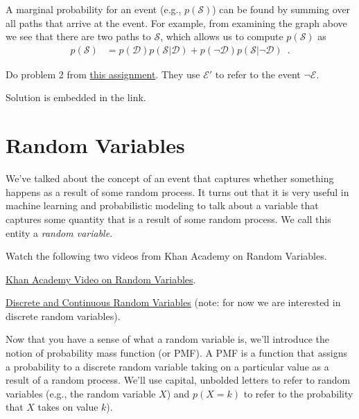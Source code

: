 \documentclass[assignment01_Solutions]{subfiles}
\begin{document}
A marginal probability for an event (e.g., $p(\mathcal{S})$) can be found by summing over all paths that arrive at the event.  For example, from examining the graph above we see that there are two paths to $\mathcal{S}$, which allows us to compute $p(\mathcal{S})$ as
\begin{align}
p(\mathcal{S}) &= p(\mathcal{D}) p(\mathcal{S}|\mathcal{D}) + p(\neg \mathcal{D}) p(\mathcal{S}|\neg \mathcal{D})  \enspace .
\end{align}


\begin{exercise}[(20 minutes)]
Do problem 2 from \href{http://wwwf.imperial.ac.uk/~atw/Bayes.pdf}{this assignment}.  They use $\mathcal{E}'$ to refer to the event $\neg \mathcal{E}$.
\begin{boxedsolution}
Solution is embedded in the link.
\end{boxedsolution}
\end{exercise}

\section{Random Variables}

We've talked about the concept of an event that captures whether something happens as a result of some random process.  It turns out that it is very useful in machine learning and probabilistic modeling to talk about a variable that captures some quantity that is a result of some random process.  We call this entity a \emph{random variable}.

\begin{externalresources}[(20 minutes)]
Watch the following two videos from Khan Academy on Random Variables.
\bi
\item \href{https://www.khanacademy.org/math/statistics-probability/random-variables-stats-library/random-variables-discrete/v/random-variables}{Khan Academy Video on Random Variables}.
\item \href{https://www.khanacademy.org/math/statistics-probability/random-variables-stats-library/random-variables-discrete/v/discrete-and-continuous-random-variables}{Discrete and Continuous Random Variables} (note: for now we are interested in discrete random variables).
\ei
\end{externalresources}

Now that you have a sense of what a random variable is, we'll introduce the notion of probability mass function (or PMF).  A PMF is a function that assigns a probability to a discrete random variable taking on a particular value as a result of a random process.  We'll use capital, unbolded letters to refer to random variables (e.g., the random variable $X$) and $p(X = k)$ to refer to the probability that $X$ takes on value $k$).
\end{document}
